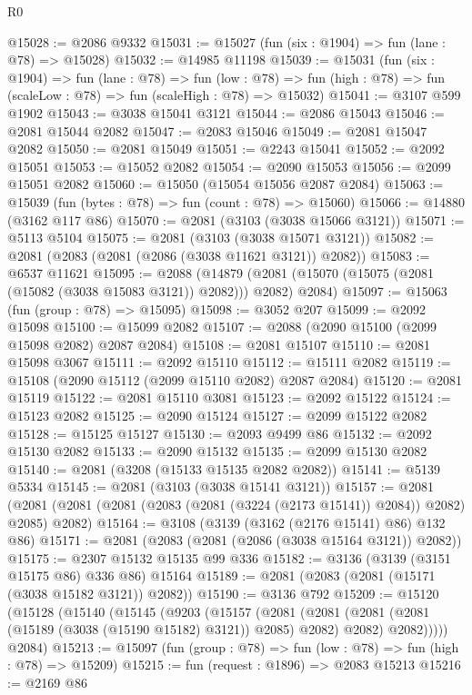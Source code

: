\begin{lexlean}{R0}
\begin{coremodule}
@15028 := @2086 @9332
@15031 := @15027 (fun (six : @1904) => fun (lane : @78) => @15028)
@15032 := @14985 @11198
@15039 := @15031
    (fun (six : @1904) =>
    fun (lane : @78) =>
    fun (low : @78) => fun (high : @78) => fun (scaleLow : @78) => fun (scaleHigh : @78) => @15032)
@15041 := @3107 @599 @1902
@15043 := @3038 @15041 @3121
@15044 := @2086 @15043
@15046 := @2081 @15044 @2082
@15047 := @2083 @15046
@15049 := @2081 @15047 @2082
@15050 := @2081 @15049
@15051 := @2243 @15041
@15052 := @2092 @15051
@15053 := @15052 @2082
@15054 := @2090 @15053
@15056 := @2099 @15051 @2082
@15060 := @15050 (@15054 @15056 @2087 @2084)
@15063 := @15039 (fun (bytes : @78) => fun (count : @78) => @15060)
@15066 := @14880 (@3162 @117 @86)
@15070 := @2081 (@3103 (@3038 @15066 @3121))
@15071 := @5113 @5104
@15075 := @2081 (@3103 (@3038 @15071 @3121))
@15082 := @2081 (@2083 (@2081 (@2086 (@3038 @11621 @3121)) @2082))
@15083 := @6537 @11621
@15095 := @2088
    (@14879 (@2081 (@15070 (@15075 (@2081 (@15082 (@3038 @15083 @3121)) @2082))) @2082) @2084)
@15097 := @15063 (fun (group : @78) => @15095)
@15098 := @3052 @207
@15099 := @2092 @15098
@15100 := @15099 @2082
@15107 := @2088 (@2090 @15100 (@2099 @15098 @2082) @2087 @2084)
@15108 := @2081 @15107
@15110 := @2081 @15098 @3067
@15111 := @2092 @15110
@15112 := @15111 @2082
@15119 := @15108 (@2090 @15112 (@2099 @15110 @2082) @2087 @2084)
@15120 := @2081 @15119
@15122 := @2081 @15110 @3081
@15123 := @2092 @15122
@15124 := @15123 @2082
@15125 := @2090 @15124
@15127 := @2099 @15122 @2082
@15128 := @15125 @15127
@15130 := @2093 @9499 @86
@15132 := @2092 @15130 @2082
@15133 := @2090 @15132
@15135 := @2099 @15130 @2082
@15140 := @2081 (@3208 (@15133 @15135 @2082 @2082))
@15141 := @5139 @5334
@15145 := @2081 (@3103 (@3038 @15141 @3121))
@15157 := @2081
    (@2081 (@2081 (@2081 (@2083 (@2081 (@3224 (@2173 @15141)) @2084)) @2082) @2085) @2082)
@15164 := @3108 (@3139 (@3162 (@2176 @15141) @86) @132 @86)
@15171 := @2081 (@2083 (@2081 (@2086 (@3038 @15164 @3121)) @2082))
@15175 := @2307 @15132 @15135 @99 @336
@15182 := @3136 (@3139 (@3151 @15175 @86) @336 @86) @15164
@15189 := @2081 (@2083 (@2081 (@15171 (@3038 @15182 @3121)) @2082))
@15190 := @3136 @792
@15209 := @15120
    (@15128
      (@15140
        (@15145
          (@9203
            (@15157
              (@2081
                (@2081 (@2081 (@2081 (@15189 (@3038 (@15190 @15182) @3121)) @2085) @2082) @2082)
                @2082)))))
      @2084)
@15213 := @15097 (fun (group : @78) => fun (low : @78) => fun (high : @78) => @15209)
@15215 := fun (request : @1896) => @2083 @15213
@15216 := @2169 @86

\end{coremodule}
\end{lexlean}
